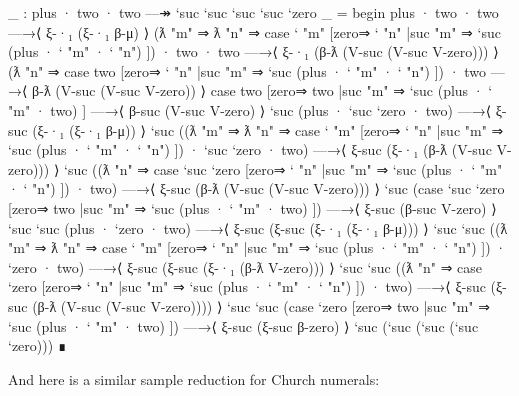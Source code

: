 \begin{fence}
\begin{code}
_ : plus · two · two —↠ `suc `suc `suc `suc `zero
_ =
  begin
    plus · two · two
  —→⟨ ξ-·₁ (ξ-·₁ β-μ) ⟩
    (ƛ "m" ⇒ ƛ "n" ⇒
      case ` "m" [zero⇒ ` "n" |suc "m" ⇒ `suc (plus · ` "m" · ` "n") ])
        · two · two
  —→⟨ ξ-·₁ (β-ƛ (V-suc (V-suc V-zero))) ⟩
    (ƛ "n" ⇒
      case two [zero⇒ ` "n" |suc "m" ⇒ `suc (plus · ` "m" · ` "n") ])
         · two
  —→⟨ β-ƛ (V-suc (V-suc V-zero)) ⟩
    case two [zero⇒ two |suc "m" ⇒ `suc (plus · ` "m" · two) ]
  —→⟨ β-suc (V-suc V-zero) ⟩
    `suc (plus · `suc `zero · two)
  —→⟨ ξ-suc (ξ-·₁ (ξ-·₁ β-μ)) ⟩
    `suc ((ƛ "m" ⇒ ƛ "n" ⇒
      case ` "m" [zero⇒ ` "n" |suc "m" ⇒ `suc (plus · ` "m" · ` "n") ])
        · `suc `zero · two)
  —→⟨ ξ-suc (ξ-·₁ (β-ƛ (V-suc V-zero))) ⟩
    `suc ((ƛ "n" ⇒
      case `suc `zero [zero⇒ ` "n" |suc "m" ⇒ `suc (plus · ` "m" · ` "n") ])
        · two)
  —→⟨ ξ-suc (β-ƛ (V-suc (V-suc V-zero))) ⟩
    `suc (case `suc `zero [zero⇒ two |suc "m" ⇒ `suc (plus · ` "m" · two) ])
  —→⟨ ξ-suc (β-suc V-zero) ⟩
    `suc `suc (plus · `zero · two)
  —→⟨ ξ-suc (ξ-suc (ξ-·₁ (ξ-·₁ β-μ))) ⟩
    `suc `suc ((ƛ "m" ⇒ ƛ "n" ⇒
      case ` "m" [zero⇒ ` "n" |suc "m" ⇒ `suc (plus · ` "m" · ` "n") ])
        · `zero · two)
  —→⟨ ξ-suc (ξ-suc (ξ-·₁ (β-ƛ V-zero))) ⟩
    `suc `suc ((ƛ "n" ⇒
      case `zero [zero⇒ ` "n" |suc "m" ⇒ `suc (plus · ` "m" · ` "n") ])
        · two)
  —→⟨ ξ-suc (ξ-suc (β-ƛ (V-suc (V-suc V-zero)))) ⟩
    `suc `suc (case `zero [zero⇒ two |suc "m" ⇒ `suc (plus · ` "m" · two) ])
  —→⟨ ξ-suc (ξ-suc β-zero) ⟩
    `suc (`suc (`suc (`suc `zero)))
  ∎
\end{code}
\end{fence}

And here is a similar sample reduction for Church numerals:

